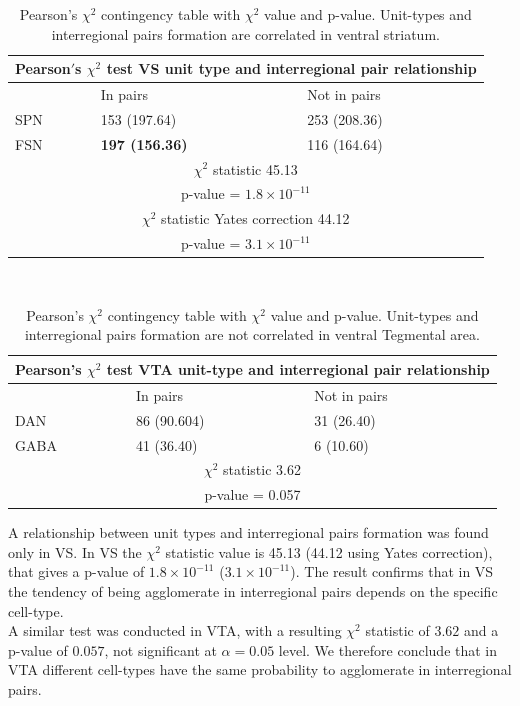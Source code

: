 \begin{table}[h!]
\begin{tabular}{ |p{3cm}|p{3cm}|p{3cm}| }
 \hline
 \multicolumn{3}{|c|}{Pearson$'$s $\chi^2$ test VS unit type and interregional pair relationship} \\
 \hline
 & In pairs & Not in pairs\\
 \hline
 SPN & 153 (197.64) & 253 (208.36) \\
 \hline
 FSN & \textbf{197 (156.36)} & 116 (164.64)\\
 \hline
 \multicolumn{3}{|c|}{$\chi^2$ statistic  45.13}\\
 \multicolumn{3}{|c|}{p-value = $1.8\times10^{-11}$}\\
 \hline
 \multicolumn{3}{|c|}{$\chi^2$ statistic Yates correction 44.12}\\
 \multicolumn{3}{|c|}{p-value = $3.1\times10^{-11}$}\\
 \hline
\end{tabular}
\caption{Pearson's $\chi^2$ contingency table with $\chi^2$ value and p-value. Unit-types and interregional pairs formation are correlated in ventral striatum.}
\label{tab:chi2_asnotasVS}
\end{table}\\
\begin{table}[h!]
\begin{tabular}{ |p{3cm}|p{3cm}|p{3cm}| }
 \hline
 \multicolumn{3}{|c|}{Pearson's $\chi^2$ test VTA unit-type and interregional pair relationship} \\
 \hline
 & In pairs & Not in pairs\\
 \hline
 DAN & 86 (90.604) & 31 (26.40) \\
 \hline
 GABA & 41 (36.40) & 6 (10.60)\\
 \hline
 \multicolumn{3}{|c|}{$\chi^2$ statistic  3.62}\\
 \multicolumn{3}{|c|}{p-value = 0.057}\\
 \hline
\end{tabular}
\caption{Pearson's $\chi^2$ contingency table with $\chi^2$ value and p-value. Unit-types and interregional pairs formation are not correlated in ventral Tegmental area.}
\label{tab:chi2_asnotasVTA}
\end{table}
A relationship between unit types and interregional pairs formation was found only in VS. In VS the $\chi^2$ statistic value is 45.13 (44.12 using Yates correction), that gives a p-value of $1.8\times10^{-11}$ ($3.1\times10^{-11}$). The result confirms that in VS the tendency of being agglomerate in interregional pairs depends on the specific cell-type.\\A similar test was conducted in VTA, with a resulting $\chi^2$ statistic of $3.62$ and a p-value of $0.057$, not significant at $\alpha = 0.05$ level. We therefore conclude that in VTA different cell-types have the same probability to agglomerate in interregional pairs.\\
